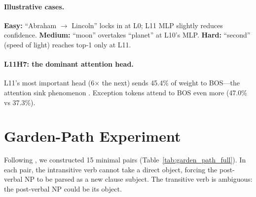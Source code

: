 \documentclass{article}
\begin{document}
\paragraph{Illustrative cases.}
\textbf{Easy:} ``Abraham $\to$ Lincoln'' locks in at L0; L11 MLP slightly
reduces confidence.
\textbf{Medium:} ``moon'' overtakes ``planet'' at L10's MLP.
\textbf{Hard:} ``second'' (speed of light) reaches top-1 only at L11.

\paragraph{L11H7: the dominant attention head.}
L11's most important head (6$\times$ the next) sends 45.4\% of weight to BOS---the
attention sink phenomenon \citep{xiao2023efficient}. Exception tokens attend to
BOS even more (47.0\% vs 37.3\%).

\section{Garden-Path Experiment}
\label{app:garden_path}

Following \citet{vangompel2001lexical}, we constructed 15 minimal pairs
(Table~\ref{tab:garden_path_full}).
In each pair, the intransitive verb cannot take a direct object, forcing
the post-verbal NP to be parsed as a new clause subject.
The transitive verb is ambiguous: the post-verbal NP could be its object.
\end{document}
